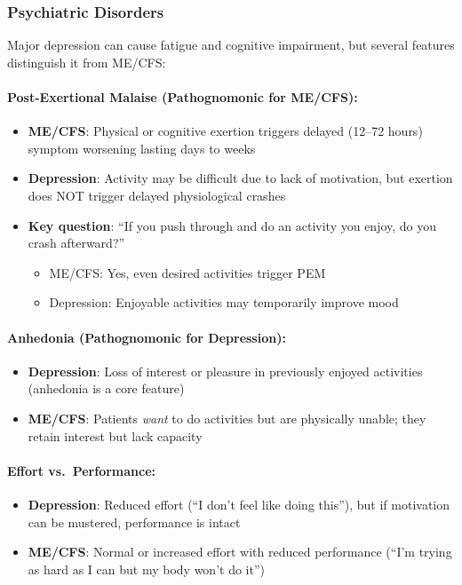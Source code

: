 \subsubsection{Psychiatric Disorders}

\begin{observation}
\label{obs:depression-distinction}

Major depression can cause fatigue and cognitive impairment, but several features distinguish it from ME/CFS:

\paragraph{Post-Exertional Malaise (Pathognomonic for ME/CFS):}
\begin{itemize}
    \item \textbf{ME/CFS}: Physical or cognitive exertion triggers delayed (12--72 hours) symptom worsening lasting days to weeks
    \item \textbf{Depression}: Activity may be difficult due to lack of motivation, but exertion does NOT trigger delayed physiological crashes
    \item \textbf{Key question}: ``If you push through and do an activity you enjoy, do you crash afterward?''
    \begin{itemize}
        \item ME/CFS: Yes, even desired activities trigger PEM
        \item Depression: Enjoyable activities may temporarily improve mood
    \end{itemize}
\end{itemize}

\paragraph{Anhedonia (Pathognomonic for Depression):}
\begin{itemize}
    \item \textbf{Depression}: Loss of interest or pleasure in previously enjoyed activities (anhedonia is a core feature)
    \item \textbf{ME/CFS}: Patients \textit{want} to do activities but are physically unable; they retain interest but lack capacity
\end{itemize}

\paragraph{Effort vs.\ Performance:}
\begin{itemize}
    \item \textbf{Depression}: Reduced effort (``I don't feel like doing this''), but if motivation can be mustered, performance is intact
    \item \textbf{ME/CFS}: Normal or increased effort with reduced performance (``I'm trying as hard as I can but my body won't do it'')
\end{itemize}


\end{observation}

